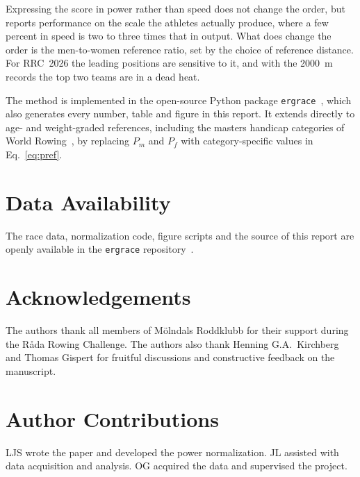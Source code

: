 \documentclass[twocolumn, 10pt]{article}
\begin{document}
Expressing the score in power rather than speed does not change the order,
but reports performance on the scale the athletes actually produce, where a
few percent in speed is two to three times that in output.
What does change the order is the men-to-women reference ratio, set by the
choice of reference distance.
For RRC~2026 the leading positions are sensitive to it, and with the
\SI{2000}{m} records the top two teams are in a dead heat.

The method is implemented in the open-source Python package
\texttt{ergrace}~\cite{ergrace}, which also generates every number, table and
figure in this report.
It extends directly to age- and weight-graded references, including the
masters handicap categories of World Rowing~\cite{WorldRowingClasses}, by
replacing $P_m$ and $P_f$ with category-specific values in
Eq.~\eqref{eq:pref}.

\section*{Data Availability}

The race data, normalization code, figure scripts and the source of this
report are openly available in the \texttt{ergrace} repository~\cite{ergrace}.

\section*{Acknowledgements}

The authors thank all members of M{\"o}lndals Roddklubb for their support
during the R{\aa}da Rowing Challenge.
The authors also thank Henning G.A.\ Kirchberg and Thomas Gispert for
fruitful discussions and constructive feedback on the manuscript.

\section*{Author Contributions}

LJS wrote the paper and developed the power normalization.
JL assisted with data acquisition and analysis.
OG acquired the data and supervised the project.
\end{document}
